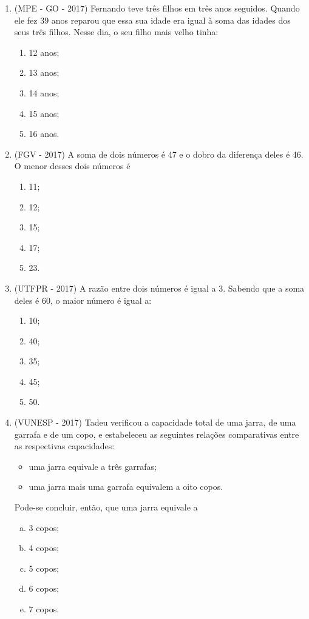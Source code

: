 \begin{enumerate}
\item (MPE - GO - 2017) Fernando teve três filhos em três anos seguidos. Quando ele fez 39 anos reparou que essa sua idade era igual à soma das idades dos seus três filhos. Nesse dia, o seu filho mais velho tinha:  
\begin{enumerate}
\item 12 anos;
\item 13 anos;
\item 14 anos;
\item 15 anos;
\item 16 anos.
\end{enumerate}

\item (FGV - 2017) A soma de dois números é 47 e o dobro da diferença deles é 46. O menor desses dois números é 
\begin{enumerate}
\item 11;
\item 12;
\item 15;
\item 17;
\item 23.
\end{enumerate}

\item (UTFPR - 2017) A razão entre dois números é igual a 3. Sabendo que a soma deles é 60, o maior número é igual a:
\begin{enumerate}
\item 10;
\item 40;
\item 35;
\item 45;
\item 50.
\end{enumerate}

\item (VUNESP - 2017) Tadeu verificou a capacidade total de uma jarra, de uma garrafa e de um copo, e estabeleceu as seguintes relações comparativas entre as respectivas capacidades:
\begin{itemize}
\item uma jarra equivale a três garrafas;
\item uma jarra mais uma garrafa equivalem a oito copos.
\end{itemize}
Pode-se concluir, então, que uma jarra equivale a
\begin{enumerate}[a)]
\item 3 copos;
\item 4 copos;
\item 5 copos;
\item 6 copos;
\item 7 copos.
\end{enumerate}


\end{enumerate}
